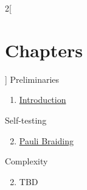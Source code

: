 \begin{multicols}{2}[\section{Chapters}]
\noindent
Preliminaries
\begin{enumerate}
\item \hyperref[introduction-section-phantom]{Introduction}
\end{enumerate}
Self-testing
\begin{enumerate}
\setcounter{enumi}{1}
\item \hyperref[paulibraiding-section-phantom]{Pauli Braiding}
\end{enumerate}
Complexity
\begin{enumerate}
\setcounter{enumi}{1}
\item TBD
\end{enumerate}
\end{multicols}